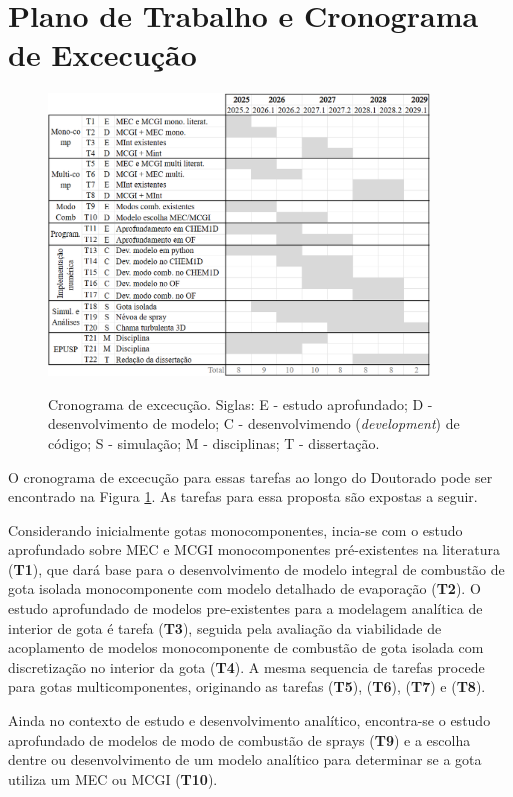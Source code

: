 \section{Plano de Trabalho e Cronograma de Excecução}


\begin{figure}[ht]
    \centering
    \caption{Cronograma de excecução. Siglas: E - estudo aprofundado; D - desenvolvimento de modelo; C - desenvolvimendo (\emph{development}) de código; S - simulação; M - disciplinas; T - dissertação.}
    \includegraphics[width=0.9\textwidth]{30_images/cronograma-3.png}
    \label{fig:cronograma}
\end{figure}

O cronograma de excecução para essas tarefas ao longo do Doutorado pode ser encontrado na Figura \ref{fig:cronograma}.
As tarefas para essa proposta são expostas a seguir.

Considerando inicialmente gotas monocomponentes, incia-se com o estudo aprofundado sobre MEC e MCGI monocomponentes pré-existentes na literatura (\textbf{T1}), que dará base para o desenvolvimento de modelo integral de combustão de gota isolada monocomponente com modelo detalhado de evaporação (\textbf{T2}).
O estudo aprofundado de modelos pre-existentes para a modelagem analítica de  interior de gota é tarefa (\textbf{T3}), seguida pela avaliação da viabilidade de acoplamento de modelos monocomponente de combustão de gota isolada com discretização no interior da gota (\textbf{T4}).
A mesma sequencia de tarefas procede para gotas multicomponentes, originando as tarefas (\textbf{T5}), (\textbf{T6}), (\textbf{T7}) e (\textbf{T8}). 

Ainda no contexto de estudo e desenvolvimento analítico, encontra-se o estudo aprofundado de modelos de modo de combustão de sprays (\textbf{T9}) e a escolha dentre  ou desenvolvimento de um modelo analítico para determinar se a gota utiliza um MEC ou MCGI (\textbf{T10}).

